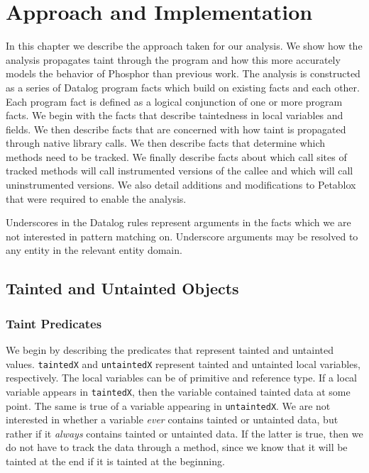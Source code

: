 \chapter{Approach and Implementation}
In this chapter we describe the approach taken for our analysis. We show how the analysis propagates taint through the program and how this more accurately models the behavior of Phosphor than previous work. The analysis is constructed as a series of Datalog program facts which build on existing facts and each other. Each program fact is defined as a logical conjunction of one or more program facts. We begin with the facts that describe taintedness in local variables and fields. We then describe facts that are concerned with how taint is propagated through native library calls. We then describe facts that determine which methods need to be tracked. We finally describe facts about which call sites of tracked methods will call instrumented versions of the callee and which will call uninstrumented versions. We also detail additions and modifications to Petablox that were required to enable the analysis.

Underscores in the Datalog rules represent arguments in the facts which we are not interested in pattern matching on. Underscore arguments may be resolved to any entity in the relevant entity domain.
\section{Tainted and Untainted Objects}
\subsection{Taint Predicates}
We begin by describing the predicates that represent tainted and untainted values. \texttt{taintedX} and \texttt{untaintedX} represent tainted and untainted local variables, respectively. The local variables can be of primitive and reference type. If a local variable appears in \texttt{taintedX}, then the variable contained tainted data at some point. The same is true of a variable appearing in \texttt{untaintedX}. We are not interested in whether a variable \textit{ever} contains tainted or untainted data, but rather if it \textit{always} contains tainted or untainted data. If the latter is true, then we do not have to track the data through a method, since we know that it will be tainted at the end if it is tainted at the beginning.

